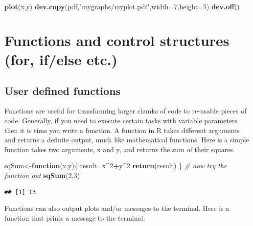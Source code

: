 \documentclass[12pt,]{krantz}
\newenvironment{Shaded}{\begin{snugshade}}{\end{snugshade}}
\newcommand{\CommentTok}[1]{\textcolor[rgb]{0.56,0.35,0.01}{\textit{#1}}}
\newcommand{\ControlFlowTok}[1]{\textcolor[rgb]{0.13,0.29,0.53}{\textbf{#1}}}
\newcommand{\DataTypeTok}[1]{\textcolor[rgb]{0.13,0.29,0.53}{#1}}
\newcommand{\DecValTok}[1]{\textcolor[rgb]{0.00,0.00,0.81}{#1}}
\newcommand{\KeywordTok}[1]{\textcolor[rgb]{0.13,0.29,0.53}{\textbf{#1}}}
\newcommand{\NormalTok}[1]{#1}
\newcommand{\OperatorTok}[1]{\textcolor[rgb]{0.81,0.36,0.00}{\textbf{#1}}}
\newcommand{\StringTok}[1]{\textcolor[rgb]{0.31,0.60,0.02}{#1}}
\begin{document}
\begin{Shaded}
\begin{Highlighting}[]
\KeywordTok{plot}\NormalTok{(x,y)}
\KeywordTok{dev.copy}\NormalTok{(pdf,}\StringTok{"mygraphs/myplot.pdf"}\NormalTok{,}\DataTypeTok{width=}\DecValTok{7}\NormalTok{,}\DataTypeTok{height=}\DecValTok{5}\NormalTok{)}
\KeywordTok{dev.off}\NormalTok{()}
\end{Highlighting}
\end{Shaded}

\hypertarget{functions-and-control-structures-for-ifelse-etc.}{%
\section{Functions and control structures (for, if/else etc.)}\label{functions-and-control-structures-for-ifelse-etc.}}

\hypertarget{user-defined-functions}{%
\subsection{User defined functions}\label{user-defined-functions}}

Functions are useful for transforming larger chunks of code to re-usable pieces of code. Generally, if you need to execute certain tasks with variable parameters then it is time you write a function. A function in R takes different arguments and returns a definite output, much like mathematical functions. Here is a simple function takes two arguments, x and y, and returns the sum of their squares.

\begin{Shaded}
\begin{Highlighting}[]
\NormalTok{sqSum<-}\ControlFlowTok{function}\NormalTok{(x,y)\{}
\NormalTok{result=x}\OperatorTok{^}\DecValTok{2}\OperatorTok{+}\NormalTok{y}\OperatorTok{^}\DecValTok{2}
\KeywordTok{return}\NormalTok{(result)}
\NormalTok{\}}
\CommentTok{# now try the function out}
\KeywordTok{sqSum}\NormalTok{(}\DecValTok{2}\NormalTok{,}\DecValTok{3}\NormalTok{)}
\end{Highlighting}
\end{Shaded}

\begin{verbatim}
## [1] 13
\end{verbatim}

Functions can also output plots and/or messages to the terminal. Here is a function that prints a message to the terminal:
\end{document}
